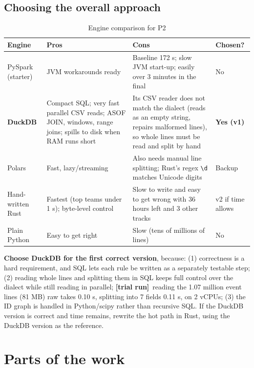 \documentclass[a4paper,12pt]{article}
\newcommand{\trial}[1]{\textcolor{p5}{\textbf{[trial run]}~#1}}
\newcommand{\fn}[1]{\texttt{\detokenize{#1}}}
\begin{document}
\subsection{Choosing the overall approach}
\begin{table}[H]
\centering\small
\begin{tabularx}{\textwidth}{L{2.6cm}YYC{1.7cm}}
\toprule
\textbf{Engine} & \textbf{Pros} & \textbf{Cons} & \textbf{Chosen?} \\
\midrule
PySpark (starter) & JVM workarounds ready & Baseline 172 s; slow JVM start-up; easily over 3 minutes in the final & No \\
\textbf{DuckDB} & Compact SQL; very fast parallel CSV reads; ASOF JOIN, windows, range joins; spills to disk when RAM runs short & Its CSV reader does not match the dialect (reads \fn{""} as an empty string, repairs malformed lines), so whole lines must be read and split by hand & \textbf{Yes (v1)} \\
Polars & Fast, lazy/streaming & Also needs manual line splitting; Rust's regex \texttt{\textbackslash d} matches Unicode digits & Backup \\
Hand-written Rust & Fastest (top teams under 1 s); byte-level control & Slow to write and easy to get wrong with 36 hours left and 3 other tracks & v2 if time allows \\
Plain Python & Easy to get right & Slow (tens of millions of lines) & No \\
\bottomrule
\end{tabularx}
\caption{Engine comparison for P2}
\end{table}

\textbf{Choose DuckDB for the first correct version}, because: (1) correctness is a hard requirement, and SQL lets each rule be written as a separately testable step; (2) reading whole lines and splitting them in SQL keeps full control over the dialect while still reading in parallel; \trial{reading the 1.07 million event lines (81 MB) raw takes 0.10 s, splitting into 7 fields 0.11 s, on 2 vCPUs}; (3) the ID graph is handled in Python/scipy rather than recursive SQL. If the DuckDB version is correct and time remains, rewrite the hot path in Rust, using the DuckDB version as the reference.

\newpage
\section{Parts of the work}

\end{document}
